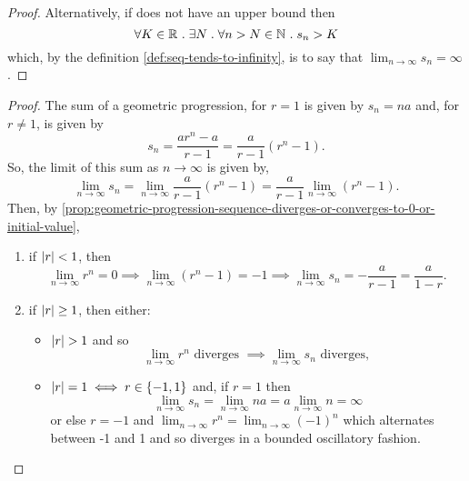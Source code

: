 \documentclass[../MathsNotesBase.tex]{subfiles}
\begin{document}
{\begin{proof}
			Alternatively, if does not have an upper bound then
			\[ \forall K \in \mathbb{R}^{} \;.\; \exists N \;.\; \forall n > N \in \mathbb{N}^{} \;.\; s_n > K \]
			which, by the definition \ref{def:seq-tends-to-infinity}, is to say that ${ \lim_{n \to \infty} s_n = \infty }$.
		\end{proof}
	
	
		
		\nl[20]
		\medskip
		\begin{proof}\nl
			The sum of a geometric progression, for ${ r = 1 }$ is given by ${ s_n = na }$ and, for ${ r \neq 1 }$, is given by
			\[ s_n = \frac{ar^n - a}{r - 1} = \frac{a}{r - 1} (r^n - 1). \]
			So, the limit of this sum as ${ n \to \infty }$ is given by,
			\[ \lim_{n \to \infty} s_n = \lim_{n \to \infty} \frac{a}{r - 1} (r^n - 1) = \frac{a}{r - 1} \lim_{n \to \infty} (r^n - 1). \]
			Then, by \autoref{prop:geometric-progression-sequence-diverges-or-converges-to-0-or-initial-value},
			\begin{enumerate}[label=(\roman*)]
				\item{if ${ \left\lvert r\right\rvert < 1 }$, then
					\[ \lim_{n \to \infty} r^n = 0 \implies \lim_{n \to \infty} (r^n - 1) = -1 \implies \lim_{n \to \infty} s_n = -\frac{a}{r - 1} = \frac{a}{1 - r}. \]
				}
				\item{if ${ \left\lvert r\right\rvert \geq 1 }$, then either:
					\begin{itemize}
						\item{${ \left\lvert r\right\rvert > 1 }$ and so
							\[ \lim_{n \to \infty} r^n \text{ diverges } \implies \lim_{n \to \infty} s_n \text{ diverges, } \]
						}
						\item{${ \left\lvert r\right\rvert = 1 \iff r \in \{-1, 1\} }$ and, if ${ r = 1 }$ then
							\[ \lim_{n \to \infty} s_n = \lim_{n \to \infty} na = a \lim_{n \to \infty} n = \infty \]
							or else ${ r = -1 }$ and ${ \lim_{n \to \infty} r^n = \lim_{n \to \infty} (-1)^n }$ which alternates between -1 and 1 and so diverges in a bounded oscillatory fashion.
						}
					\end{itemize}
				}
			\end{enumerate}
		\end{proof}
	
}
\end{document}
